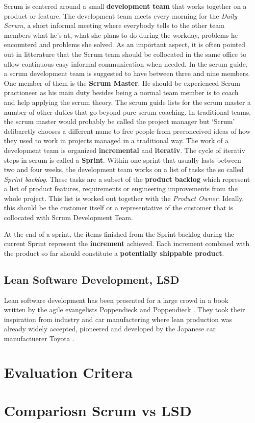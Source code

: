 \documentclass[a4paper,11pt,twoside]{article}
\begin{document}
Scrum is centered around a small \textbf{development team} that works together on a product or feature. The development team  meets every morning for the \textit{Daily Scrum}, a short informal meeting where everybody tells to the other team members what he's at, what she plans to do during the workday, problems he encounterd and problems she solved. As an important aspect, it is often pointed out in litterature that the Scrum team should be collocated in the same office to allow continuous easy informal communication when needed. In the scrum guide, a scrum development team is suggested to have between three and nine members. One member of them is the \textbf{Scrum Master}. He should be experienced Scrum practioneer as his main duty besides being a normal team member is to coach and help applying the scrum theory. The scrum guide lists for the scrum master a number of other duties that go beyond pure scrum coaching. In traditional teams, the scrum master would probably be called the project manager but `Scrum' delibaretly chooses a different name to free people from preconceived ideas of how they used to work in projects managed in a traditional way.  
The work of a development team is organized \textbf{incremental} and \textbf{iterativ}. The cycle of iterativ steps in scrum is called a \textbf{Sprint}. Within one sprint that usually lasts between two and four weeks, the development team works on a list of tasks the so called \textit{Sprint backlog}. These tasks are a subset of the \textbf{product backlog} which represent a list of product features, requirements or engineering improvements from the whole project. This list is worked out together with the \textit{Product Owner}. Ideally, this should be the customer itself or a representative of the customer that is collocated with Scrum Development Team.

At the end of a sprint, the items finished from the Sprint backlog during the current Sprint represent the \textbf{increment} achieved. Each increment combined with the product so far should constitute a \textbf{potentially shippable product}.







\subsection{Lean Software Development, LSD}
Lean software development has been presented for a large crowd in a book written by the agile evangelists Poppendieck and Poppendieck \cite{poppendieck2003}. They took their inspiration from industry and car manufactering where lean production was already widely accepted, pioneered and developed by the Japanese car manufactuerer Toyota \cite{toyota}.

\section{Evaluation Critera}

\section{Compariosn Scrum vs LSD}




\end{document}

